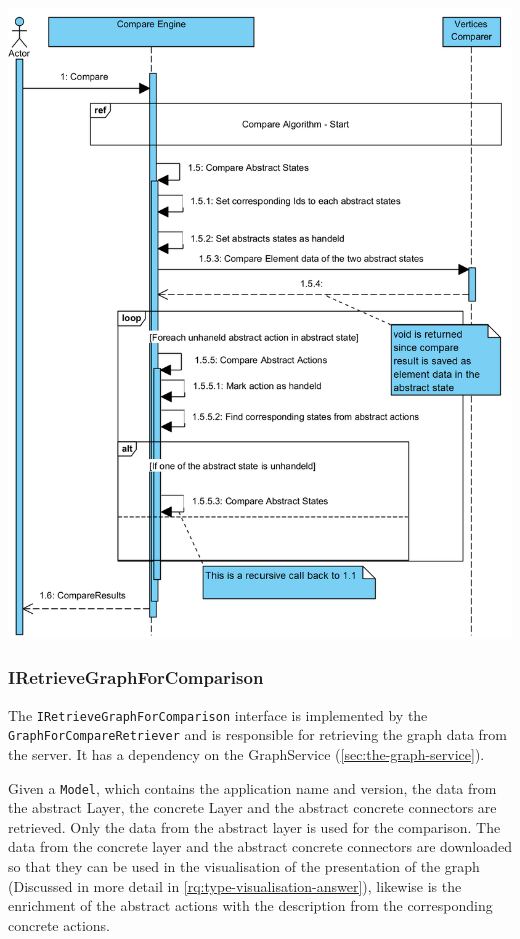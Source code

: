 \newpage

\begingroup
\captionsetup{type=figure}
\includegraphics[scale=0.9]{content/5-Results/Images/Compare-algorithm-compare.png}
\label{fig:compare-algorithm-compare}
\endgroup

\subsubsection{IRetrieveGraphForComparison}
The \verb|IRetrieveGraphForComparison| interface is implemented by the \verb|GraphForCompareRetriever| and is responsible for retrieving the graph data from the server. It has a dependency on the GraphService (\ref{sec:the-graph-service}). 

Given a \verb|Model|, which contains the application name and version, the data from the abstract Layer, the concrete Layer and the abstract concrete connectors are retrieved. Only the data from the abstract layer is used for the comparison. The data from the concrete layer and the abstract concrete connectors are downloaded so that they can be used in the visualisation of the presentation of the graph (Discussed in more detail in \ref{rq:type-visualisation-answer}), likewise is the enrichment of the abstract actions with the description from the corresponding concrete actions.

